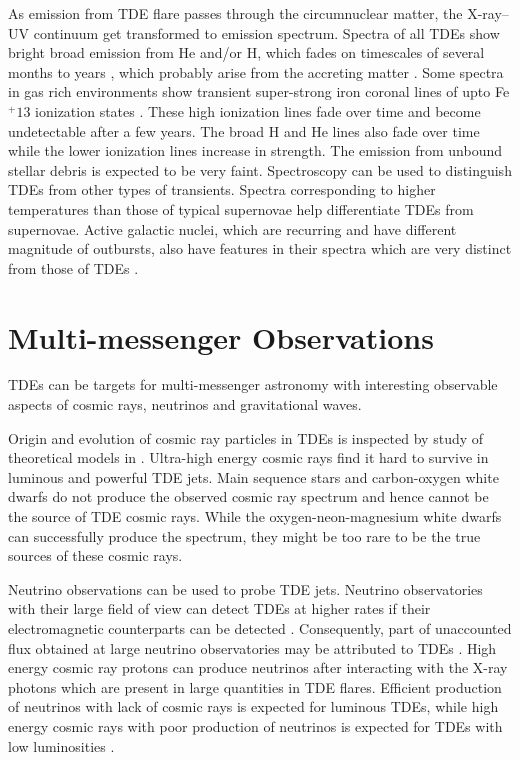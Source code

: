 \documentclass{tda}
\begin{document}
As emission from TDE flare passes through the circumnuclear matter, the X-ray--UV continuum get transformed to emission spectrum. Spectra of all TDEs show bright broad emission from He and/or H, which fades on timescales of several months to years \cite{komossa_tidal_2015, wang_transient_2011}, which probably arise from the accreting matter \cite{guillochon_hydrodynamical_2013, komossa_tidal_2015}. Some spectra in gas rich environments show transient super-strong iron coronal lines of upto Fe\(^+13\) ionization states \cite{wang_transient_2011}. These high ionization lines fade over time and become undetectable after a few years. The broad H and He lines also fade over time while the lower ionization lines increase in strength. The emission from unbound stellar debris is expected to be very faint.
Spectroscopy can be used to distinguish TDEs from other types of transients. Spectra corresponding to higher temperatures than those of typical supernovae help differentiate TDEs from supernovae. Active galactic nuclei, which are recurring and have different magnitude of outbursts, also have features in their spectra which are very distinct from those of TDEs \cite{arcavi_continuum_2014}.


\section{Multi-messenger Observations}

TDEs can be targets for multi-messenger astronomy with interesting observable aspects of cosmic rays, neutrinos and gravitational waves.

Origin and evolution of cosmic ray particles in TDEs is inspected by study of theoretical models in \cite{zhang_high-energy_2017}. Ultra-high energy cosmic rays find it hard to survive in luminous and powerful TDE jets. Main sequence stars and carbon-oxygen white dwarfs do not produce the observed cosmic ray spectrum and hence cannot be the source of TDE cosmic rays. While the oxygen-neon-magnesium white dwarfs can successfully produce the spectrum, they might be too rare to be the true sources of these cosmic rays.

Neutrino observations can be used to probe TDE jets. Neutrino observatories with their large field of view can detect TDEs at higher rates if their electromagnetic counterparts can be detected \cite{wang_probing_2011}. Consequently, part of unaccounted flux obtained at large neutrino observatories may be attributed to TDEs \cite{lunardini_high_2017}. High energy cosmic ray protons can produce neutrinos after interacting with the X-ray photons which are present in large quantities in TDE flares. Efficient production of neutrinos with lack of cosmic rays is expected for luminous TDEs, while high energy cosmic rays with poor production of neutrinos is expected for TDEs with low luminosities \cite{zhang_high-energy_2017}. 
\end{document}

